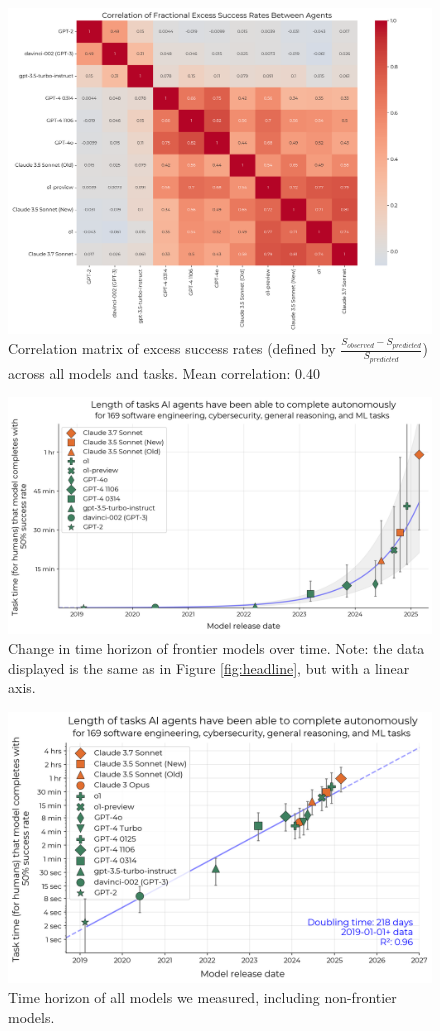 \documentclass{article}
\begin{document}
\begin{figure}
    \centering
    \includegraphics[width=0.8\linewidth]{plots/success_correlations/fractional_excess_success_rates_correlations.png}
    \caption{Correlation matrix of excess success rates (defined by $\frac{S_{observed}-S_{predicted}}{S_{predicted}}$) across all models and tasks. Mean correlation: 0.40}
    \label{fig:corr_matrix_fractional_success_rates}
\end{figure}

\begin{figure}
    \centering
    \includegraphics[width=0.9\linewidth]{plots/bootstrap/headline-linear.png}
    \caption{Change in time horizon of frontier models over time. Note: the data displayed is the same as in Figure \ref{fig:headline}, but with a linear axis.}
    \label{fig:headline-linear}
\end{figure}

\begin{figure}
    \centering
    \includegraphics[width=0.8\linewidth]{plots/logistic/all_models.png}
    \caption{Time horizon of all models we measured, including non-frontier models.}
    \label{fig:all-models}
\end{figure}
\end{document}
